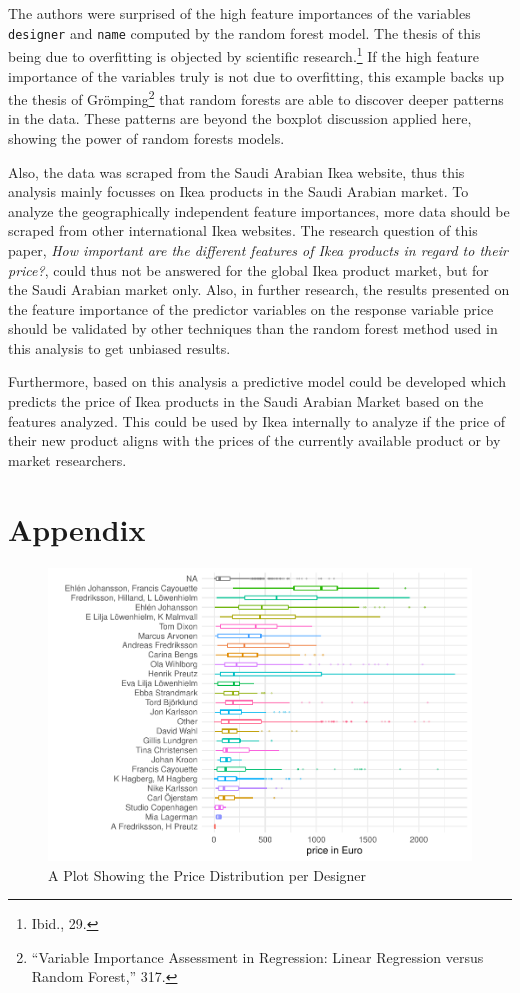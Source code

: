 \documentclass[a4paper, nobind]{templates/ociamthesis}
\begin{document}
The authors were surprised of the high feature importances of the variables \texttt{designer} and \texttt{name} computed by the random forest model. The thesis of this being due to overfitting is objected by scientific research.\footnote{Ibid., 29.} If the high feature importance of the variables truly is not due to overfitting, this example backs up the thesis of Grömping\footnote{``Variable Importance Assessment in Regression: Linear Regression versus Random Forest,'' 317.} that random forests are able to discover deeper patterns in the data. These patterns are beyond the boxplot discussion applied here, showing the power of random forests models.

Also, the data was scraped from the Saudi Arabian Ikea website, thus this analysis mainly focusses on Ikea products in the Saudi Arabian market. To analyze the geographically independent feature importances, more data should be scraped from other international Ikea websites. The research question of this paper, \emph{How important are the different features of Ikea products in regard to their price?}, could thus not be answered for the global Ikea product market, but for the Saudi Arabian market only. Also, in further research, the results presented on the feature importance of the predictor variables on the response variable price should be validated by other techniques than the random forest method used in this analysis to get unbiased results.

Furthermore, based on this analysis a predictive model could be developed which predicts the price of Ikea products in the Saudi Arabian Market based on the features analyzed. This could be used by Ikea internally to analyze if the price of their new product aligns with the prices of the currently available product or by market researchers.

\startappendices

\hypertarget{appendix}{%
\chapter{Appendix}\label{appendix}}

\begin{figure}
\includegraphics[width=1\linewidth]{_main_files/figure-latex/price-dist-per-designer-1} \caption{A Plot Showing the Price Distribution per Designer}\label{fig:price-dist-per-designer}
\end{figure}
\end{document}
